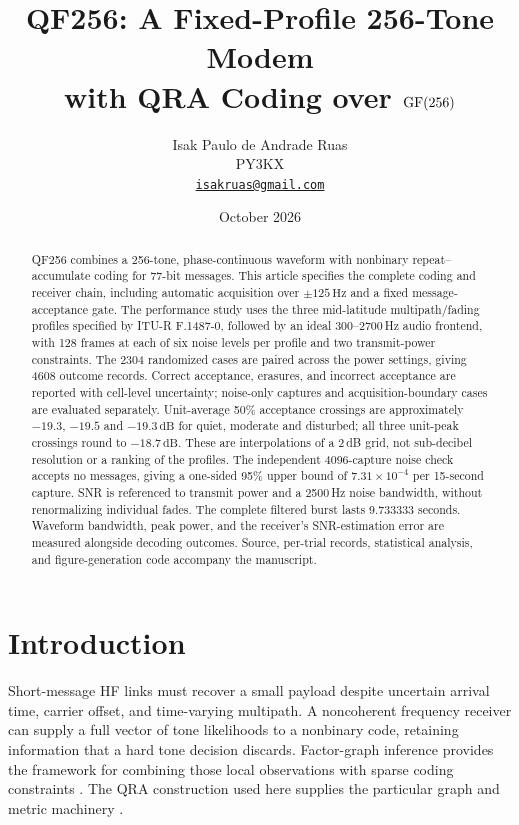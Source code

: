\documentclass[11pt,a4paper]{article}
\title{QF256: A Fixed-Profile 256-Tone Modem\\
with QRA Coding over $\mathrm{GF}(256)$}
\author{Isak Paulo de Andrade Ruas\\
\small PY3KX\\
\small\href{mailto:isakruas@gmail.com}{\texttt{isakruas@gmail.com}}}
\date{October 2026}
\newcommand{\Hz}{\,\mathrm{Hz}}
\newcommand{\dB}{\,\mathrm{dB}}
\begin{document}
\maketitle

\begin{abstract}
QF256 combines a 256-tone, phase-continuous waveform with nonbinary
repeat--accumulate coding for 77-bit messages. This article specifies the
complete coding and receiver chain, including automatic acquisition over
$\pm125\Hz$ and a fixed message-acceptance gate. The performance study uses
the three mid-latitude multipath/fading profiles specified by ITU-R F.1487-0,
followed by an ideal
300--2700\,Hz audio frontend, with 128 frames at each of six noise levels
per profile and two transmit-power constraints. The 2304 randomized cases
are paired across the power settings, giving 4608 outcome records.
Correct acceptance, erasures, and incorrect acceptance are reported with
cell-level uncertainty; noise-only captures and acquisition-boundary cases
are evaluated separately. Unit-average 50\% acceptance crossings are
approximately $-19.3$, $-19.5$ and $-19.3\dB$ for quiet, moderate and
disturbed; all three unit-peak crossings round to $-18.7\dB$.
These are interpolations of a 2\,dB grid, not sub-decibel resolution or a
ranking of the profiles. The independent 4096-capture noise check accepts
no messages, giving a one-sided 95\% upper bound of
$7.31\times10^{-4}$ per 15-second capture.
SNR is referenced to transmit power and a
2500\,Hz noise bandwidth, without renormalizing individual fades.
The complete filtered burst lasts 9.733333 seconds. Waveform bandwidth,
peak power, and the receiver's SNR-estimation error are measured alongside
decoding outcomes. Source, per-trial records, statistical analysis, and
figure-generation code accompany the manuscript.
\end{abstract}

\section{Introduction}
\label{sec:scope}

Short-message HF links must recover a small payload despite uncertain
arrival time, carrier offset, and time-varying multipath. A noncoherent
frequency receiver can supply a full vector of tone likelihoods to a
nonbinary code, retaining information that a hard tone decision discards.
Factor-graph inference provides the framework for combining those local
observations with sparse coding constraints \cite{sumproduct}. The QRA
construction used here supplies the particular graph and metric machinery
\cite{provenance}.
\end{document}
